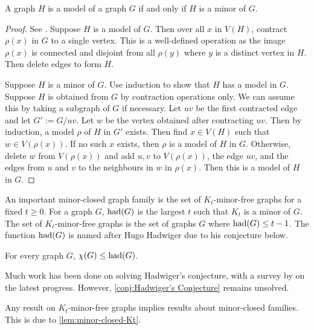 \begin{lemma}
	A graph \(H\) is a model of a graph \(G\) if and only if $H$ is a minor of $G$.
\end{lemma}

\begin{proof}
	See \textcite{norinMath599GraphMinors2017}. Suppose \(H\) is a model of \(G\). Then over all \(x\) in \(V(H)\), contract \(\rho(x)\) in \(G\) to a single vertex. This is a well-defined operation as the image $\rho(x)$ is connected and disjoint from all $\rho(y)$ where $y$ is a distinct vertex in $H$. Then delete edges to form \(H\).

	Suppose $H$ is a minor of $G$. Use induction to show that \(H\) has a model in \(G\). Suppose \(H\) is obtained from \(G\) by contraction operations only. We can assume this by taking a subgraph of \(G\) if necessary. Let \(uv\) be the first contracted edge and let \(G' := G / uv\). Let \(w\) be the vertex obtained after contracting \(uv\). Then by induction, a model \(\rho\) of \(H\) in \(G'\) exists. Then find $x \in V(H)$ such that $w \in V(\rho(x))$. If no such $x$ exists, then $\rho$ is a model of $H$ in $G$. Otherwise, delete \(w\) from \(V(\rho(x)) \) and add $u, v$ to $V(\rho(x))$, the edge $uv$, and the edges from $u$ and $v$ to the neighbours in $w$ in $\rho(x)$. Then this is a model of \(H\) in \(G\). 
\end{proof}

An important minor-closed graph family is the set of \(K_t\)-minor-free graphs for a fixed $t \geq 0$. For a graph \(G\), \(\operatorname{had}(G)\) is the largest \(t\) such that \(K_t\) is a minor of \(G\). The set of $K_t$-minor-free graphs is the set of graphs $G$ where $\operatorname{had}(G) \leq t - 1$. The function $\operatorname{had}(G)$ is named after Hugo Hadwiger due to his conjecture below.
\begin{conjecture}\label{conj:Hadwiger's Conjecture}
	For every graph \(G\), \(\chi(G) \leq \operatorname{had}(G)\).
\end{conjecture}
Much work has been done on solving Hadwiger's conjecture, with a survey by \textcite{seymourHadwigersConjecture2016} on the latest progress. However, \cref{conj:Hadwiger's Conjecture} remains unsolved.

 Any result on $K_t$-minor-free graphs implies results about minor-closed families. This is due to \cref{lem:minor-closed-Kt}. 

